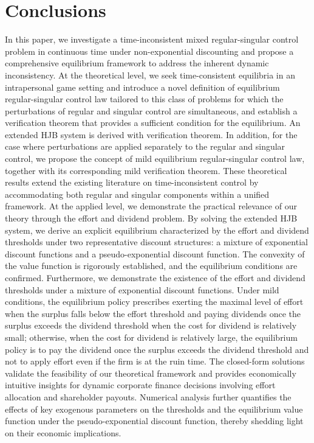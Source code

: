 \documentclass[11pt,reqno]{article}%
\numberwithin{equation}{section}
\begin{document}
\section{Conclusions}
In this paper, we investigate a time-inconsistent mixed regular-singular control problem in continuous time under non-exponential discounting and propose a comprehensive equilibrium framework to address the inherent dynamic inconsistency. At the theoretical level, we seek time-consistent equilibria in an intrapersonal game setting and introduce a novel definition of equilibrium regular-singular control law tailored to this class of problems for which the perturbations of regular and singular control are simultaneous, and establish a verification theorem that provides a sufficient condition for the equilibrium. An extended HJB system is derived with verification theorem. In addition, for the case where perturbations are applied separately to the regular and singular control, we propose the concept of mild equilibrium regular-singular control law, together with its corresponding mild verification theorem. These theoretical results extend the existing literature on time-inconsistent control by accommodating both regular and singular components within a unified framework. At the applied level, we demonstrate the practical relevance of our theory through the effort and dividend problem. By solving the extended HJB system, we derive an explicit equilibrium characterized by the effort and dividend thresholds under two representative discount structures: a mixture of exponential discount functions and a pseudo-exponential discount function. The convexity of the value function is rigorously established, and the equilibrium conditions are confirmed. Furthermore, we demonstrate the existence of the effort and dividend thresholds under a mixture of exponential discount functions. Under mild conditions, the equilibrium policy prescribes exerting the maximal level of effort when the surplus falls below the effort threshold and paying dividends once the surplus exceeds the dividend threshold when the cost for dividend is relatively small; otherwise, when the cost for dividend is relatively large, the equilibrium policy is to pay the dividend once the surplus exceeds the dividend threshold and not to apply effort even if the firm is at the ruin time. The closed-form solutions validate the feasibility of our theoretical framework and provides economically intuitive insights for dynamic corporate finance decisions involving effort allocation and shareholder payouts. Numerical analysis further quantifies the effects of key exogenous parameters on the thresholds and the equilibrium value function under the pseudo-exponential discount function, thereby shedding light on their economic implications.
\end{document}
